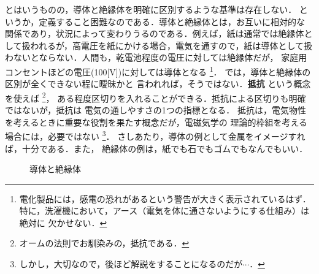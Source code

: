         とはいうものの，導体と絶縁体を明確に区別するような基準は存在しない．
        というか，定義すること困難なのである．導体と絶縁体とは，お互いに相対的な
        関係であり，状況によって変わりうるのである．例えば，紙は通常では絶縁体と
        して扱われるが，高電圧を紙にかける場合，電気を通すので，紙は導体として扱
        わないとならない．人間も，乾電池程度の電圧に対しては絶縁体だが，
        家庭用コンセントほどの電圧(100[V])に対しては導体となる
            \footnote{
                電化製品には，感電の恐れがあるという警告が大きく表示されているはず．
                特に，洗濯機において，アース（電気を体に通さないようにする仕組み）は絶対に
                欠かせない．
            }．
        では，導体と絶縁体の区別が全くできない程に曖昧かと
        言われれば，そうではない．\textbf{抵抗} という概念を使えば
            \footnote{
                オームの法則でお馴染みの，抵抗である．
            }，
        ある程度区切りを入れることができる．抵抗による区切りも明確ではないが，抵抗は
        電気の通しやすさの1つの指標となる．
        抵抗は，電気物性を考えるときに重要な役割を果たす概念だが，電磁気学の
        理論的枠組を考える場合には，必要ではない
            \footnote{
                しかし，大切なので，後ほど解説をすることになるのだが$\cdots$．
            }．
        さしあたり，導体の例として金属をイメージすれば，十分である．また，
        絶縁体の例は，紙でも石でもゴムでもなんでもいい．
                \begin{figure}[hbt]
                    \begin{center}
                        \caption{導体と絶縁体}
                        \label{fig:DoutaiZetsuentai001}
                    \end{center}
                \end{figure}

